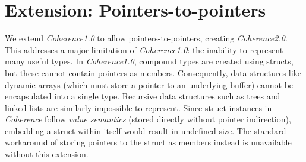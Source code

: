 \section{Extension: Pointers-to-pointers} \label{sec:pointers-to-pointers}
We extend \textit{Coherence1.0} to allow pointers-to-pointers, creating \textit{Coherence2.0}. This addresses a major limitation of \textit{Coherence1.0}: the inability to represent many useful types. In \textit{Coherence1.0}, compound types are created using structs, but these cannot contain pointers as members. Consequently, data structures like dynamic arrays (which must store a pointer to an underlying buffer) cannot be encapsulated into a single type. Recursive data structures such as trees and linked lists are similarly impossible to represent. Since struct instances in \textit{Coherence} follow \textit{value semantics} (stored directly without pointer indirection), embedding a struct within itself would result in undefined size. The standard workaround of storing pointers to the struct as members instead is unavailable without this extension.
